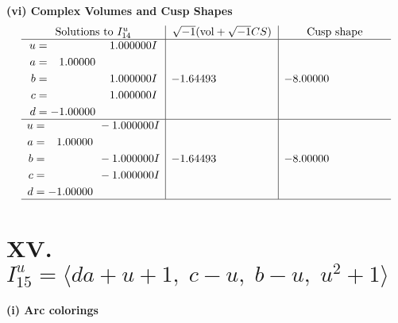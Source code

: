 \documentclass[1p]{elsarticle_modified}
\theoremstyle{definition}
\newcommand{\I}{\sqrt{-1}}
\begin{document}
\newpage\flushleft \textbf{(vi) Complex Volumes and Cusp Shapes}
$$\begin{array}{c|c|c}  
\text{Solutions to }I^u_{14}& \I (\text{vol} + \sqrt{-1}CS) & \text{Cusp shape}\\
 \hline 
\begin{aligned}
u &= \phantom{-0.000000 -}1.000000 I \\
a &= \phantom{-}1.00000\phantom{ +0.000000I} \\
b &= \phantom{-0.000000 -}1.000000 I \\
c &= \phantom{-0.000000 -}1.000000 I \\
d &= -1.00000\phantom{ +0.000000I}\end{aligned}
 & -1.64493\phantom{ +0.000000I} & -8.00000\phantom{ +0.000000I} \\ \hline\begin{aligned}
u &= \phantom{-0.000000 } -1.000000 I \\
a &= \phantom{-}1.00000\phantom{ +0.000000I} \\
b &= \phantom{-0.000000 } -1.000000 I \\
c &= \phantom{-0.000000 } -1.000000 I \\
d &= -1.00000\phantom{ +0.000000I}\end{aligned}
 & -1.64493\phantom{ +0.000000I} & -8.00000\phantom{ +0.000000I}\\
 \hline 
 \end{array}$$\newpage\newpage\renewcommand{\arraystretch}{1}
\centering \section*{XV. $I^u_{15}= \langle d a+u+1,\;c- u,\;b- u,\;u^2+1 \rangle$}
\flushleft \textbf{(i) Arc colorings}\\
\end{document}
